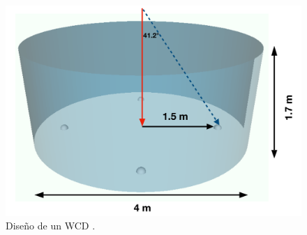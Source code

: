 \begin{figure}[H]
	\includegraphics[scale=.1]{imagenes/01_Introduccion/wcd.png}
	\centering
	\caption{Diseño de un WCD \cite{gonzalez2021tackling}.}
\end{figure}
